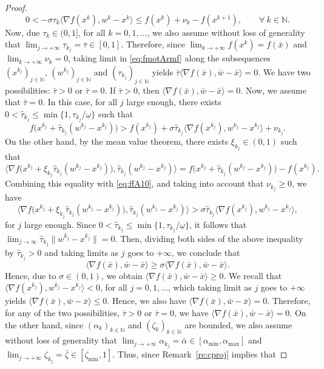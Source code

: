 \begin{proof}
	\begin{equation}\label{eq:fmotArmf}
		0 < -\sigma\tau_{k} \big\langle \nabla f(x^{k}), w^{k}-x^{k} \big\rangle \leq f(x^{k}) +\nu_k- f(x^{k+1}), \qquad \forall ~k \in \mathbb{N}.
	\end{equation}
	Now, due $\tau_k \in (0,1]$, for all $k=0,1, \ldots$, we also assume without loss of generality that $\lim_{j \to +\infty} \tau_{k_j} = \bar{\tau} \in [0,1].$
	Therefore,   since $\lim_{k\to +\infty} f(x^{k}) =f(\bar{x})$ and $\lim_{k\to +\infty} \nu_{k} = 0$, taking limit in \eqref{eq:fmotArmf} along the  subsequences  $(x^{k_j})_{j\in\mathbb{N}}$,  $(w^{k_j})_{j\in\mathbb{N}}$ and $(\tau_{k_j})_{j\in\mathbb{N}}$  yields
	$
		\bar{\tau} \big\langle \nabla f(\bar{x}), \bar{w}- \bar{x} \big\rangle=0.
	$
	We have two possibilities: $\bar{\tau} > 0$ or $\bar{\tau} = 0$. If $\bar{\tau} > 0$, then  $\big\langle \nabla f(\bar{x}), \bar{w}- \bar{x} \big\rangle = 0.$
	Now, we  assume that $\bar{\tau} = 0$. In this case, for all $j$ large enough, there exists $0<\hat\tau_{k_j}\leq \min\{1,\tau_{k_j}/\underline\omega\}$ such that
	\begin{equation}\label{eq:ffA10}
		f\big(x^{k_j}+\hat\tau_{k_j} (w^{k_j} - x^{k_j})\big) > f(x^{k_j}) + \sigma \hat\tau_{k_j} \big\langle \nabla f(x^{k_j}), w^{k_j} - x^{k_j} \big\rangle +\nu_{k_j}.
	\end{equation}
	On the other hand, by the mean value theorem, there exists $\xi_{k_j}\in(0,1)$ such that
	$$\langle \nabla f\big(x^{k_j}+\xi_{k_j}\hat\tau_{k_j} (w^{k_j} - x^{k_j})\big), \hat\tau_{k_j} (w^{k_j} - x^{k_j})\rangle = f\big(x^{k_j}+\hat\tau_{k_j} (w^{k_j} - x^{k_j})\big) - f(x^{k_j}).$$
	Combining this equality with \eqref{eq:ffA10}, and taking into account that $\nu_{k_j}\geq 0$, we have
	$$\langle \nabla f\big(x^{k_j}+\xi_{k_j}\hat\tau_{k_j} (w^{k_j} - x^{k_j})\big), \hat\tau_{k_j} (w^{k_j} - x^{k_j})\rangle>\sigma \hat\tau_{k_j} \big\langle \nabla f(x^{k_j}), w^{k_j} - x^{k_j} \big\rangle,$$
	for $j$ large enough. Since $0<\hat\tau_{k_j}\leq \min\{1,\tau_{k_j}/\underline\omega\}$, it follows that $\lim_{j\to\infty} \hat\tau_{k_j} \|w^{k_j} - x^{k_j}\|=0$. Then, dividing both sides of the above inequality by $\hat\tau_{k_j}>0$ and taking limits as $j$ goes to $+\infty$, we conclude that 
	$$ \langle \nabla f(\bar{x}), \bar{w}-\bar{x} \rangle \geq \sigma \langle \nabla f(\bar{x}), \bar{w}-\bar{x} \rangle.$$   
	Hence, due to $\sigma \in (0, 1)$, we obtain $\langle \nabla f(\bar{x}), \bar{w}-\bar{x} \rangle \geq 0$. We recall that $\langle \nabla f(x^{k_j}), w^{k_j}- x^{k_j} \rangle < 0$, for all $j=0, 1, \ldots$, which taking limit as $j$ goes to $+\infty$ yields $\langle \nabla f(\bar{x}), \bar{w}-\bar{x} \rangle \leq 0.$ Hence, we also have $\langle \nabla f(\bar{x}), \bar{w}-\bar{x} \rangle = 0$. Therefore, for any of the two possibilities, $\bar{\tau} > 0$ or $\bar{\tau} = 0$, we have $\langle \nabla f(\bar{x}), \bar{w}-\bar{x} \rangle = 0$. On the other hand,  since  $(\alpha_k)_{k\in\mathbb{N}}$ and    $(\zeta_k)_{k\in\mathbb{N}}$   are  bounded, we also assume without loss of generality that $\lim_{j \to +\infty} \alpha_{k_j} = \bar{\alpha} \in [\alpha_{\min}, \alpha_{\max}]$ and $\lim_{j \to +\infty} \zeta_{k_j} = {\bar \zeta} \in [\zeta_{\min}, 1]$. Thus, since Remark~\ref{re:cproj} implies that

\end{proof}
